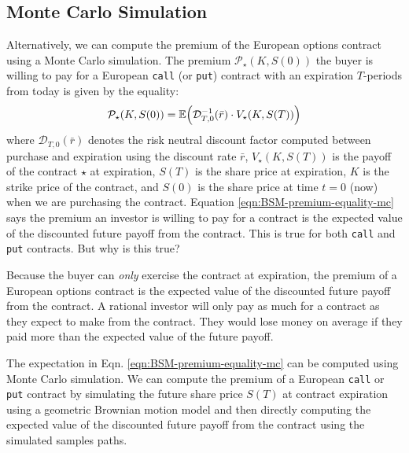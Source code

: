 \documentclass[11pt]{article}
\theoremstyle{definition}
\begin{document}
\subsection*{Monte Carlo Simulation}
Alternatively, we can compute the premium of the European options contract using a Monte Carlo simulation.
The premium $\mathcal{P}_{\star}(K,S(0))$ the buyer is willing to pay for a European \texttt{call} (or \texttt{put}) contract with an expiration $T$-periods from today is given by the equality:
\begin{equation}\label{eqn:BSM-premium-equality-mc}
\mathcal{P}_{\star}(K,S(0)) = \mathbb{E}\Bigl(\mathcal{D}^{-1}_{T,0}(\bar{r})\cdot{V_{\star}}(K,S(T))\Bigr)
\end{equation}
where $\mathcal{D}_{T,0}(\bar{r})$ denotes the risk neutral discount factor computed between purchase and expiration using the discount rate $\bar{r}$,
$V_{\star}(K,S(T))$ is the payoff of the contract $\star$ at expiration, $S(T)$ is the share price at expiration, $K$ is the strike price of the contract, 
and $S(0)$ is the share price at time $t=0$ (now) when we are purchasing the contract. Equation \ref{eqn:BSM-premium-equality-mc} says the premium an investor is willing to pay for a contract 
is the expected value of the discounted future payoff from the contract. This is true for both \texttt{call} and \texttt{put} contracts. But why is this true?

\begin{concept}
Because the buyer can \textit{only} exercise the contract at expiration, the premium of a European options contract is the expected value of the discounted future payoff from the contract.
A rational investor will only pay as much for a contract as they expect to make from the contract. 
They would lose money on average if they paid more than the expected value of the future payoff.
\end{concept}
The expectation in Eqn. \ref{eqn:BSM-premium-equality-mc} can be computed using Monte Carlo simulation.
We can compute the premium of a European \texttt{call} or \texttt{put} contract by simulating the future share price $S(T)$ at contract expiration
using a geometric Brownian motion model and then directly computing the expected value of the discounted future payoff from the contract 
using the simulated samples paths. 
\end{document}

